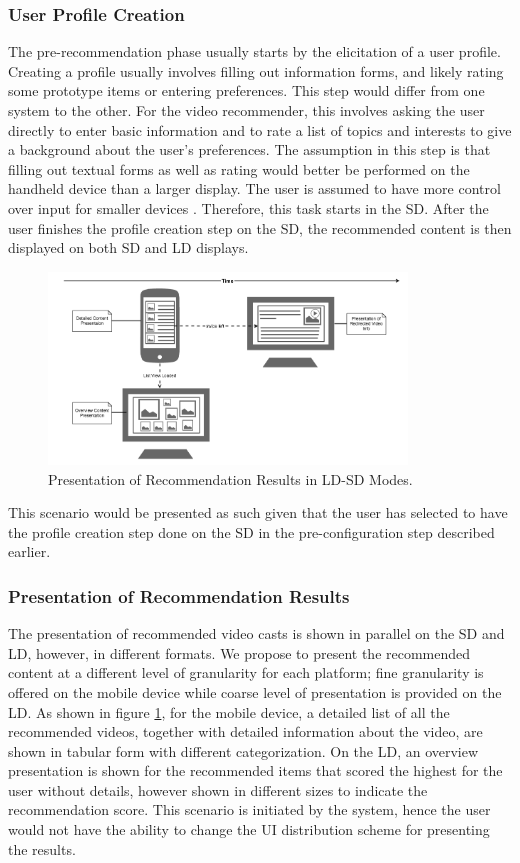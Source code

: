 \subsubsection{User Profile Creation}
The pre-recommendation phase usually starts by the elicitation of a user profile. Creating a profile usually involves filling out information forms, and likely rating some prototype items or entering preferences. This step would differ from one system to the other. For the video recommender, this involves asking the user directly to enter basic information and to rate a list of topics and interests to give a background about the user's preferences. 
The assumption in this step is that filling out textual forms as well as rating
would better be performed on the handheld device than a larger display. The user
is assumed to have more control over input for smaller devices
\cite{kaviani2011dual}. Therefore, this task starts in the SD. After the user
finishes the profile creation step on the SD, the recommended content is then displayed on both SD and LD displays.
\begin{figure}[h!]
\includegraphics[width=0.85\textwidth, center,
center]{figures/presentation-detail}
\caption{Presentation of Recommendation Results in LD-SD Modes.}
\label{fig:figure38}
\end{figure} 
This scenario would be presented as such given that the user has selected to have the profile creation step done on the SD in the pre-configuration step described earlier.

\subsubsection{Presentation of Recommendation Results}
The presentation of recommended video casts is shown in parallel on the SD and LD, however, in different formats. We propose to present the recommended content at a different level of granularity for each platform; fine granularity is offered on the mobile device while coarse level of presentation is provided on the LD. As shown in figure \ref{fig:figure38}, for the mobile device, a detailed list of all the recommended videos, together with detailed information about the video, are shown in tabular form with different categorization. On the LD, an overview presentation is shown for the recommended items that scored the highest for the user without details, however shown in different sizes to indicate the recommendation score. This scenario is initiated by the system, hence the user would not have the ability to change the UI distribution scheme for presenting the results.

